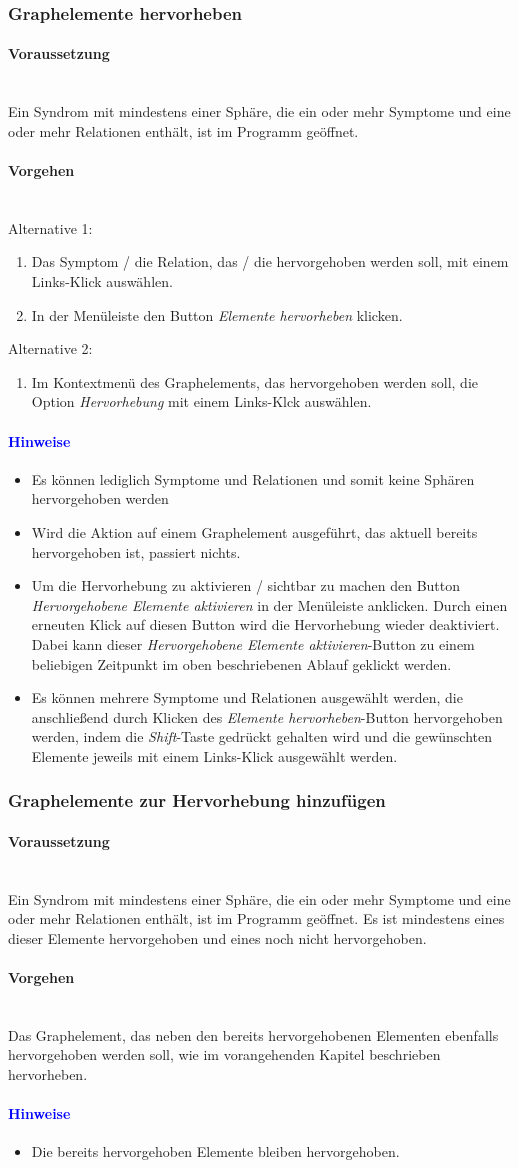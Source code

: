 \documentclass[enabledeprecatedfontcommands,fontsize=11pt,paper=a4,twoside]{scrartcl}
\newcounter{one}
\newcommand*{\hint}{\paragraph{\textcolor{blue}{Hinweise}}}
\newcommand*{\condition}{\paragraph{Voraussetzung}$\;$ \vspace{0.2cm}\\}
\newcommand*{\actions}{\paragraph{Vorgehen} $\;$\vspace{0.2cm}\\}
\begin{document}
		\subsubsection{Graphelemente hervorheben}
		\condition 	
		Ein Syndrom mit mindestens einer Sphäre, die ein oder mehr Symptome und eine oder mehr Relationen enthält, ist im Programm geöffnet. 
		\actions
		Alternative 1:
		\begin{enumerate}
			\item Das Symptom / die Relation, das / die hervorgehoben werden soll, mit einem Links-Klick auswählen. 
			\item In der Menüleiste den Button \textit{Elemente hervorheben} klicken.
		\end{enumerate}
				Alternative 2:
		\begin{enumerate}
			\item Im Kontextmenü des Graphelements, das hervorgehoben werden soll, die Option \textit{Hervorhebung} mit einem Links-Klck auswählen.
		\end{enumerate}
		\hint
		\begin{itemize}
					\item Es können lediglich Symptome und Relationen und somit keine Sphären hervorgehoben werden
					\item Wird die Aktion auf einem Graphelement ausgeführt, das aktuell bereits hervorgehoben ist, passiert nichts.
					\item Um die Hervorhebung zu aktivieren / sichtbar zu machen den Button \textit{Hervorgehobene Elemente aktivieren} in der Menüleiste anklicken. Durch einen erneuten Klick auf diesen Button wird die Hervorhebung wieder deaktiviert. Dabei kann dieser \textit{Hervorgehobene Elemente aktivieren}-Button zu einem beliebigen Zeitpunkt im oben beschriebenen Ablauf geklickt werden.
					\item Es können mehrere Symptome und Relationen ausgewählt werden, die anschließend durch Klicken des \textit{Elemente hervorheben}-Button hervorgehoben werden, indem die \textit{Shift}-Taste gedrückt gehalten wird und die gewünschten Elemente jeweils mit einem Links-Klick ausgewählt werden.
		\end{itemize}
		
			\newpage
		\subsubsection{Graphelemente zur Hervorhebung hinzufügen}
				\condition 	
		Ein Syndrom mit mindestens einer Sphäre, die ein oder mehr Symptome und eine oder mehr Relationen enthält, ist im Programm geöffnet. Es ist mindestens eines dieser Elemente hervorgehoben und eines noch nicht hervorgehoben.
		\actions
		Das Graphelement, das neben den bereits hervorgehobenen Elementen ebenfalls hervorgehoben werden soll, wie im vorangehenden Kapitel beschrieben hervorheben.
		\hint
		\begin{itemize}
					\item Die bereits hervorgehoben Elemente bleiben hervorgehoben.
		\end{itemize}
		
\end{document}
